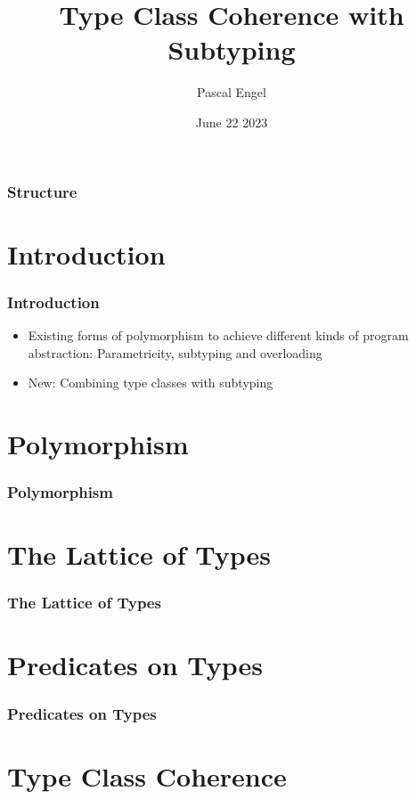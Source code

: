 \documentclass{beamer}
\title{Type Class Coherence with Subtyping}
\author{Pascal Engel}
\date{June 22 2023}
\begin{document}
\begin{frame}
    \maketitle
\end{frame}

\begin{frame}
    \frametitle{Structure}
    \tableofcontents
\end{frame}

\section{Introduction}

\begin{frame}
    \frametitle{Introduction}

    \begin{itemize}
        \item Existing forms of polymorphism to achieve different kinds of program abstraction: Parametricity, subtyping and overloading
        \item New: Combining type classes with subtyping
    \end{itemize}
\end{frame}

\section{Polymorphism}

\begin{frame}
    \frametitle{Polymorphism}
\end{frame}

\section{The Lattice of Types}

\begin{frame}
    \frametitle{The Lattice of Types}
\end{frame}

\section{Predicates on Types}

\begin{frame}
    \frametitle{Predicates on Types}
\end{frame}

\section{Type Class Coherence}
\end{document}
